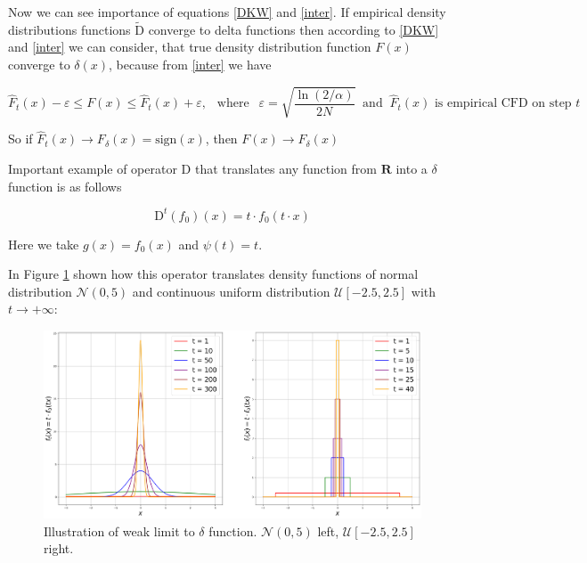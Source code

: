 \documentclass{article}
\begin{document}
    Now we can see importance of equations \eqref{DKW} and \eqref{inter}. If empirical density distributions functions $\widetilde{\text{D}}$ converge to delta functions then according to \eqref{DKW} and \eqref{inter} we can consider, that true density distribution function $F(x)$ converge to $\delta(x)$, because from \eqref{inter} we have

    \begin{equation*}
        \hat{F}_t(x) - \varepsilon \leq F(x) \leq \hat{F}_t(x) + \varepsilon, ~~ \text{ where } ~~ \varepsilon = \sqrt{\dfrac{\ln(2/\alpha)}{2N}} ~\text{ and }~ \hat{F}_t(x) \text{ is empirical CFD on step } t
    \end{equation*}

    So if $\hat{F}_t(x) \to F_{\delta}(x) = \text{sign}(x)$, then $F(x) \to F_{\delta}(x)$
    
    Important example of operator $\text{D}$ that translates any function from $\mathbf{R}$ into a $\delta$ function is as follows

    \begin{equation} \label{example1}
        \text{D}^t(f_0)(x) = t \cdot f_0(t \cdot x)
    \end{equation}

    Here we take $g(x) = f_0(x)$ and $\psi(t) = t$. 
    
    In Figure \ref{example1_fig} shown how this operator translates density functions of normal distribution $\mathcal{N}(0, 5)$ and continuous uniform distribution $\mathcal{U}[-2.5, 2.5]$ with $t \to +\infty$:

    \begin{figure}[h!]
        \centering
        \includegraphics[width = 0.99\linewidth]{pictures/example1.png}
        \caption{Illustration of weak limit to $\delta$ function. $\mathcal{N}(0, 5)$ left, $\mathcal{U}[-2.5, 2.5]$ right.}
        \label{example1_fig}
    \end{figure}
\end{document}

